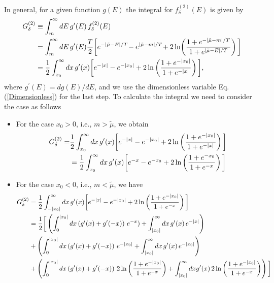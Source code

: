 \documentclass[sn-mathphys,Numbered]{sn-jnl}
\theoremstyle{thmstyleone}%
\theoremstyle{thmstyletwo}%
\theoremstyle{thmstylethree}%
\begin{document}
In general, for a given function $g(E)$ the integral for $f_\delta^{(2)}(E)$ is given by
\begin{align}
\label{Integral002}
G_\delta^{(2)}&\equiv\int^\infty_{m}dE\,g^\prime(E)\,f^{(2)}_\delta(E)\notag\\
&=\int^\infty_{m}dE\,g^\prime(E)\frac{T}{2}\bigg[e^{-|\tilde\mu-E|/T}\!-e^{|\tilde\mu-m|/T}\!+2\ln\!\left(\frac{1+e^{-|\tilde\mu-m|/T}}{1+e^{|\tilde\mu-E|/T}}\right)\bigg]\notag\\
&=\frac{1}{2}\int^\infty_{x_0}dx\,g^\prime(x)\bigg[e^{-|x|}-e^{-|x_0|}+2\ln\left(\frac{1+e^{-|x_0|}}{1+e^{-|x|}}\right)\bigg],
\end{align}
where $g^\prime(E)=dg(E)/dE$, and we use the  dimensionless variable Eq. (\ref{Dimensionless}) for the last step. To calculate the integral we need to consider the case as follows
\begin{itemize}
  \item For the case $x_0>0$, i.e., $m>\tilde\mu$, we obtain
  \begin{align}
  G_\delta^{(2)}=&\frac{1}{2}\int^\infty_{x_0}dx\,g^\prime(x)\bigg[e^{-|x|}-e^{-|x_0|}+2\ln\left(\frac{1+e^{-|x_0|}}{1+e^{-|x|}}\right)\bigg]\notag\\
  &=\frac{1}{2}\int^\infty_{x_0}dx\,g^\prime(x)\bigg[e^{-x}-e^{-x_0}+2\ln\left(\frac{1+e^{-x_0}}{1+e^{-x}}\right)\bigg]
  \end{align}
  \item For the case $x_0<0$, i.e., $m<\tilde\mu$, we have
  \begin{align}
   G^{(2)}_\delta&=\frac{1}{2}\int^\infty_{-|x_0|}dx\,g^\prime(x)\bigg[e^{-|x|}-e^{-|x_0|}+2\ln\left(\frac{1+e^{-|x_0|}}{1+e^{-x}}\right)\bigg]\notag\\
   &=\frac{1}{2}\bigg[\left(\int^{|x_0|}_0dx\left(g^\prime(x)+g^\prime(-x)\right)\,e^{-x})+\int^\infty_{|x_0|}dx\,g^\prime(x)\,e^{-|x|}\right)\notag\\
   &+\left(\int^{|x_0|}_0dx\left(g^\prime(x)+g^\prime(-x)\right)\,e^{-|x_0|}+\int^\infty_{|x_0|}dx\,g^\prime(x)\,e^{-|x_0|}\right)\notag\\
&+\left(\int^{|x_0|}_0dx\left(g^\prime(x)+g^\prime(-x)\right)\,2\ln\left(\frac{1+e^{-|x_0|}}{1+e^{-x}}\right)+\int^\infty_{|x_0|}dxg^\prime(x)\,2\ln\left(\frac{1+e^{-|x_0|}}{1+e^{-x}}\right)\right)\bigg]
  \end{align}
\end{itemize}
\end{document}
